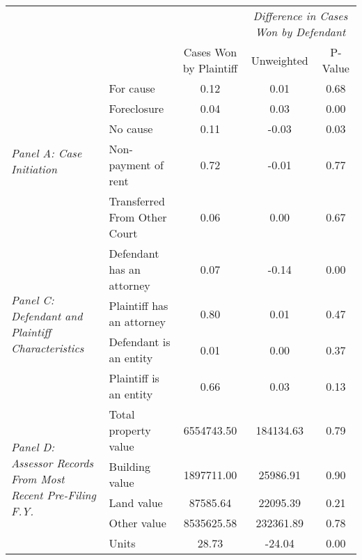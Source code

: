 \begin{tabular}{llccc}
\toprule
 &  & \textit{} & \multicolumn{2}{|c|}{\textit{Difference in Cases Won by Defendant}} \\
 &  & Cases Won by Plaintiff & Unweighted & P-Value \\
\midrule
\multirow[c]{5}{4cm}{\textit{Panel A: Case Initiation}} & For cause & 0.12 & 0.01 & 0.68 \\
 & Foreclosure & 0.04 & 0.03 & 0.00 \\
 & No cause & 0.11 & -0.03 & 0.03 \\
 & Non-payment of rent & 0.72 & -0.01 & 0.77 \\
 & Transferred From Other Court & 0.06 & 0.00 & 0.67 \\
\cline{1-5}
\multirow[c]{4}{4cm}{\textit{Panel C: Defendant and Plaintiff Characteristics}} & Defendant has an attorney & 0.07 & -0.14 & 0.00 \\
 & Plaintiff has an attorney & 0.80 & 0.01 & 0.47 \\
 & Defendant is an entity & 0.01 & 0.00 & 0.37 \\
 & Plaintiff is an entity & 0.66 & 0.03 & 0.13 \\
\cline{1-5}
\multirow[c]{5}{4cm}{\textit{Panel D: Assessor Records From Most Recent Pre-Filing F.Y.}} & Total property value & 6554743.50 & 184134.63 & 0.79 \\
 & Building value & 1897711.00 & 25986.91 & 0.90 \\
 & Land value & 87585.64 & 22095.39 & 0.21 \\
 & Other value & 8535625.58 & 232361.89 & 0.78 \\
 & Units & 28.73 & -24.04 & 0.00 \\
\cline{1-5}
\bottomrule
\end{tabular}

